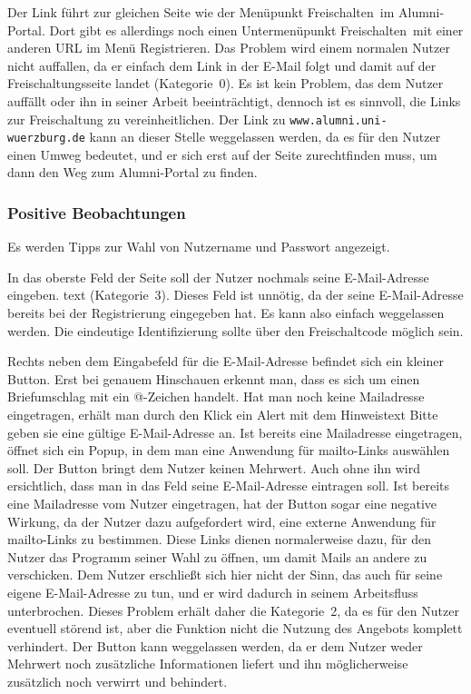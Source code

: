 {
Der Link führt zur gleichen Seite wie der Menüpunkt \glqq Freischalten\grqq ~im Alumni-Portal. Dort gibt es allerdings noch einen Untermenüpunkt \glqq Freischalten\grqq ~mit einer anderen URL im Menü  \glqq Registrieren\grqq.
}
{
Das Problem wird einem normalen Nutzer nicht auffallen, da er einfach dem Link in der E\hbox{-}Mail folgt und damit auf der Freischaltungsseite landet (Kategorie~0).
}
{
Es ist kein Problem, das dem Nutzer auffällt oder ihn in seiner Arbeit beeinträchtigt, dennoch ist es sinnvoll, die Links zur Freischaltung zu vereinheitlichen. Der Link zu \texttt{www.alumni.uni-wuerzburg.de} kann an dieser Stelle weggelassen werden, da es für den Nutzer einen Umweg bedeutet, und er sich erst auf der Seite zurechtfinden muss, um dann den Weg zum Alumni-Portal zu finden.
}


\subsubsection*{Positive Beobachtungen}
\label{subsubsec:freischaltung_webseite_positiv}
Es werden Tipps zur Wahl von Nutzername und Passwort angezeigt.

{
In das oberste Feld der Seite soll der Nutzer nochmals seine E\hbox{-}Mail-Adresse eingeben.
}
{
text  (Kategorie~3).
}
{
Dieses Feld ist unnötig, da der seine E\hbox{-}Mail-Adresse bereits bei der Registrierung eingegeben hat. Es kann also einfach weggelassen werden. Die eindeutige Identifizierung sollte über den Freischaltcode möglich sein.
}

{
Rechts neben dem Eingabefeld für die E\hbox{-}Mail-Adresse befindet sich ein kleiner Button. Erst bei genauem Hinschauen erkennt man, dass es sich um einen Briefumschlag mit ein @-Zeichen handelt. Hat man noch keine Mailadresse eingetragen, erhält man durch den Klick ein Alert mit dem Hinweistext \glqq Bitte geben sie eine gültige E\hbox{-}Mail-Adresse an\grqq . Ist bereits eine Mailadresse eingetragen, öffnet sich ein Popup, in dem man eine Anwendung für mailto-Links auswählen soll.
}
{
Der Button bringt dem Nutzer keinen Mehrwert. Auch ohne ihn wird ersichtlich, dass man in das Feld seine E\hbox{-}Mail-Adresse eintragen soll. Ist bereits eine Mailadresse vom Nutzer eingetragen, hat der Button sogar eine negative Wirkung, da der Nutzer dazu aufgefordert wird, eine externe Anwendung für mailto-Links zu bestimmen. Diese Links dienen normalerweise dazu, für den Nutzer das Programm seiner Wahl zu öffnen, um damit Mails an andere zu verschicken. Dem Nutzer erschließt sich hier nicht der Sinn, das auch für seine eigene E\hbox{-}Mail-Adresse zu tun, und er wird dadurch in seinem Arbeitsfluss unterbrochen. Dieses Problem erhält daher die Kategorie~2, da es für den Nutzer eventuell störend ist, aber die Funktion nicht die Nutzung des Angebots komplett verhindert.
}
{
Der Button kann weggelassen werden, da er dem Nutzer weder Mehrwert noch zusätzliche Informationen liefert und ihn möglicherweise zusätzlich noch verwirrt und behindert.
}

